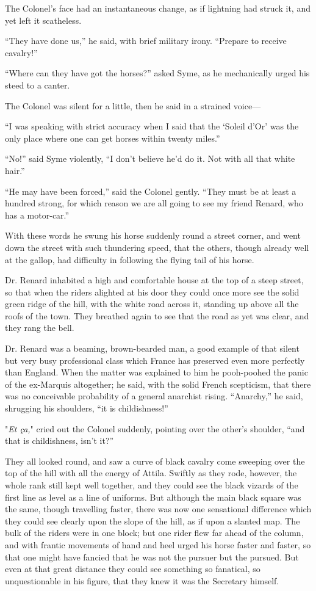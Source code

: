 \documentclass{book}
\begin{document}
The Colonel’s face had an instantaneous change, as if lightning had struck it, and yet left it scatheless.

“They have done us,” he said, with brief military irony. “Prepare to receive cavalry!”

“Where can they have got the horses?” asked Syme, as he mechanically urged his steed to a canter.

The Colonel was silent for a little, then he said in a strained voice—

“I was speaking with strict accuracy when I said that the ‘Soleil d’Or’ was the only place where one can get horses within twenty miles.”

“No!” said Syme violently, “I don’t believe he’d do it. Not with all that white hair.”

“He may have been forced,” said the Colonel gently. “They must be at least a hundred strong, for which reason we are all going to see my friend Renard, who has a motor-car.”

With these words he swung his horse suddenly round a street corner, and went down the street with such thundering speed, that the others, though already well at the gallop, had difficulty in following the flying tail of his horse.

Dr. Renard inhabited a high and comfortable house at the top of a steep street, so that when the riders alighted at his door they could once more see the solid green ridge of the hill, with the white road across it, standing up above all the roofs of the town. They breathed again to see that the road as yet was clear, and they rang the bell.

Dr. Renard was a beaming, brown-bearded man, a good example of that silent but very busy professional class which France has preserved even more perfectly than England. When the matter was explained to him he pooh-poohed the panic of the ex-Marquis altogether; he said, with the solid French scepticism, that there was no conceivable probability of a general anarchist rising. “Anarchy,” he said, shrugging his shoulders, “it is childishness!”

"\emph{Et ça,}" cried out the Colonel suddenly, pointing over the other’s shoulder, “and that is childishness, isn’t it?”

They all looked round, and saw a curve of black cavalry come sweeping over the top of the hill with all the energy of Attila. Swiftly as they rode, however, the whole rank still kept well together, and they could see the black vizards of the first line as level as a line of uniforms. But although the main black square was the same, though travelling faster, there was now one sensational difference which they could see clearly upon the slope of the hill, as if upon a slanted map. The bulk of the riders were in one block; but one rider flew far ahead of the column, and with frantic movements of hand and heel urged his horse faster and faster, so that one might have fancied that he was not the pursuer but the pursued. But even at that great distance they could see something so fanatical, so unquestionable in his figure, that they knew it was the Secretary himself.
\end{document}
